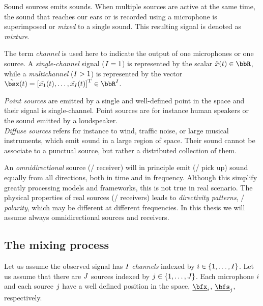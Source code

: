 Sound sources emits sounds.
When multiple sources are active at the same time, the sound that reaches our ears or is recorded using a microphone is superimposed or \textit{mixed} to a single sound.
This resulting signal is denoted as \textit{mixture}.

The term \textit{channel} is used here to indicate the output of one microphones or one source.
A \textit{single-channel} signal ($I = 1$) is represented by the scalar $\contTime[t]{\mic} \in \R$,
while a \textit{multichannel} ($I >   1$) is represented by the vector $\contTime[t]{\mics} = \ktranspose{\klist{\contTime[t]{\mic_1}, \dots, \contTime[t]{\mic_{\numMics}}}} \in \R^{\numMics}$.

\textit{Point sources} are emitted by a single and well-defined point in the space and their signal is single-channel.
Point sources are for instance human speakers or the sound emitted by a loudspeaker.
\\\textit{Diffuse sources} refers for instance to wind, traffic noise, or large musical instruments, which emit sound in a large region of space.
Their sound cannot be associate to a punctual source, but rather a distributed collection of them.

An \textit{omnidirectional} source (\resp/ receiver) will in principle emit (\resp/ pick up) sound equally from all directions,
both in time and in frequency.
Although this simplify greatly processing models and frameworks, this is not true in real scenario.
The physical properties of real sources (\resp/ receivers) leads to \textit{directivity patterns}, \aka/ \textit{polarity}, which may
be different at different frequencies.
In this thesis we will assume always omnidirectional sources and receivers.

\subsection{The mixing process}
Let us assume the observed signal has $I$ \textit{channels} indexed by $\idxMic \in \kbrace{1,\dots,\numMics}$.
Let us assume that there are $J$ sources indexed by $\idxSrc \in \kbrace{1,\dots,\numSrcs}$.
Each microphone $i$ and each source $j$ have a well defined position in the space, $\positionMicrophone_\idxMic$, $\positionSource_\idxSrc$, respectively.

